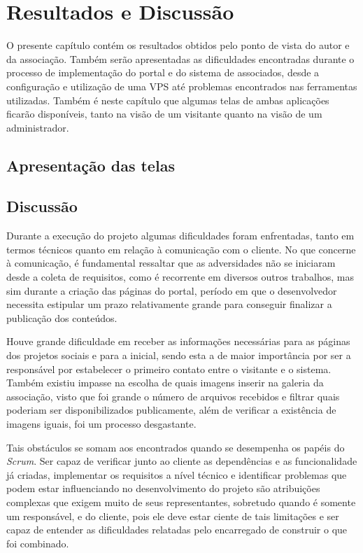\chapter{Resultados e Discussão}

O presente capítulo contém os resultados obtidos pelo ponto de vista do autor e da associação. Também serão apresentadas as dificuldades encontradas durante o processo de implementação do portal e do sistema de associados, desde a configuração e utilização de uma VPS até problemas encontrados nas ferramentas utilizadas. Também é neste capítulo que algumas telas de ambas aplicações ficarão disponíveis, tanto na visão de um visitante quanto na visão de um administrador.

\hspace{2.5cm}
\section{Apresentação das telas}
\label{subsec:telas}
\hspace{2.5cm}

\hspace{2.5cm}
\section{Discussão}
\label{subsec:telas}
\hspace{2.5cm}

Durante a execução do projeto algumas dificuldades foram enfrentadas, tanto em termos técnicos quanto em relação à comunicação com o cliente. No que concerne à comunicação, é fundamental ressaltar que as adversidades não se iniciaram desde a coleta de requisitos, como é recorrente em diversos outros trabalhos, mas sim durante a criação das páginas do portal, período em que o desenvolvedor necessita estipular um prazo relativamente grande para conseguir finalizar a publicação dos conteúdos.

Houve grande dificuldade em receber as informações necessárias para as páginas dos projetos sociais e para a inicial, sendo esta a de maior importância por ser a responsável por estabelecer o primeiro contato entre o visitante e o sistema. Também existiu impasse na escolha de quais imagens inserir na galeria da associação, visto que foi grande o número de arquivos recebidos e filtrar quais poderiam ser disponibilizados publicamente, além de verificar a existência de imagens iguais, foi um processo desgastante.

Tais obstáculos se somam aos encontrados quando se desempenha os papéis do \textit{Scrum}. Ser capaz de verificar junto ao cliente as dependências e as funcionalidade já criadas, implementar os requisitos a nível técnico e identificar problemas que podem estar influenciando no desenvolvimento do projeto são atribuições complexas que exigem muito de seus representantes, sobretudo quando é somente um responsável, e do cliente, pois ele deve estar ciente de tais limitações e ser capaz de entender as dificuldades relatadas pelo encarregado de construir o que foi combinado.

